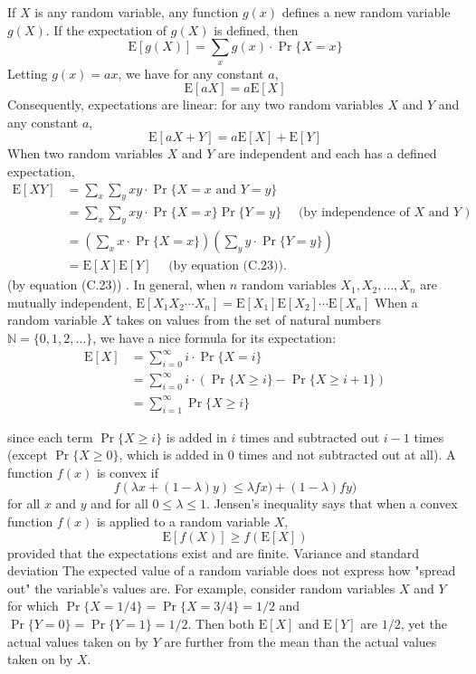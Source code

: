 \documentclass[lang=cn,newtx,10pt,scheme=chinese]{elegantbook}
\begin{document}
If $X$ is any random variable, any function $g(x)$ defines a new random variable $g(X)$. If the expectation of $g(X)$ is defined, then
$$
\mathrm{E}[g(X)]=\sum_x g(x) \cdot \operatorname{Pr}\{X=x\}
$$
Letting $g(x)=a x$, we have for any constant $a$,
$$
\mathrm{E}[a X]=a \mathrm{E}[X]
$$
Consequently, expectations are linear: for any two random variables $X$ and $Y$ and any constant $a$,
$$
\mathrm{E}[a X+Y]=a \mathrm{E}[X]+\mathrm{E}[Y]
$$
When two random variables $X$ and $Y$ are independent and each has a defined expectation,
$$
\begin{aligned}
\mathrm{E}[X Y] & =\sum_x \sum_y x y \cdot \operatorname{Pr}\{X=x \text { and } Y=y\} \\
& =\sum_x \sum_y x y \cdot \operatorname{Pr}\{X=x\} \operatorname{Pr}\{Y=y\} \quad \text { (by independence of } X \text { and } Y \text { ) } \\
& =\left(\sum_x x \cdot \operatorname{Pr}\{X=x\}\right)\left(\sum_y y \cdot \operatorname{Pr}\{Y=y\}\right) \\
& =\mathrm{E}[X] \mathrm{E}[Y] \quad \text { (by equation (C.23)). }
\end{aligned}
$$
(by equation (C.23)) .
In general, when $n$ random variables $X_1, X_2, \ldots, X_n$ are mutually independent, $\mathrm{E}\left[X_1 X_2 \cdots X_n\right]=\mathrm{E}\left[X_1\right] \mathrm{E}\left[X_2\right] \cdots \mathrm{E}\left[X_n\right]$
When a random variable $X$ takes on values from the set of natural numbers $\mathbb{N}=\{0,1,2, \ldots\}$, we have a nice formula for its expectation:
$$
\begin{aligned}
\mathrm{E}[X] & =\sum_{i=0}^{\infty} i \cdot \operatorname{Pr}\{X=i\} \\
& =\sum_{i=0}^{\infty} i \cdot(\operatorname{Pr}\{X \geq i\}-\operatorname{Pr}\{X \geq i+1\}) \\
& =\sum_{i=1}^{\infty} \operatorname{Pr}\{X \geq i\}
\end{aligned}
$$

since each term $\operatorname{Pr}\{X \geq i\}$ is added in $i$ times and subtracted out $i-1$ times (except $\operatorname{Pr}\{X \geq 0\}$, which is added in 0 times and not subtracted out at all).
A function $f(x)$ is convex if
$$
f(\lambda x+(1-\lambda) y) \leq \lambda f x)+(1-\lambda) f y)
$$
for all $x$ and $y$ and for all $0 \leq \lambda \leq 1$. Jensen's inequality says that when a convex function $f(x)$ is applied to a random variable $X$,
$$
\mathrm{E}[f(X)] \geq f(\mathrm{E}[X])
$$
provided that the expectations exist and are finite.
Variance and standard deviation
The expected value of a random variable does not express how "spread out" the variable's values are. For example, consider random variables $X$ and $Y$ for which $\operatorname{Pr}\{X=1 / 4\}=\operatorname{Pr}\{X=3 / 4\}=1 / 2$ and $\operatorname{Pr}\{Y=0\}=\operatorname{Pr}\{Y=1\}=1 / 2$. Then both $\mathrm{E}[X]$ and $\mathrm{E}[Y]$ are $1 / 2$, yet the actual values taken on by $Y$ are further from the mean than the actual values taken on by $X$.
\end{document}
